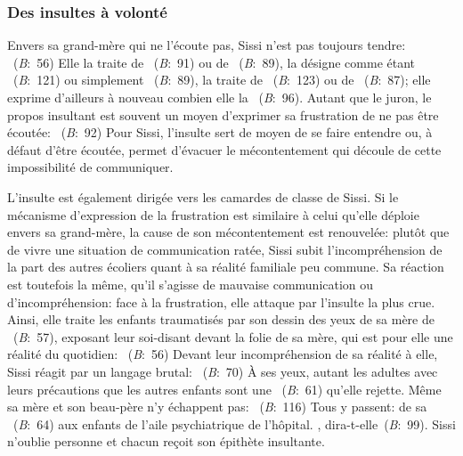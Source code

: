 \subsubsection{Des insultes à volonté}
Envers sa grand-mère qui ne l'écoute pas, Sissi n'est pas toujours tendre: ~(\textit{B}:~56)
Elle la traite de ~(\textit{B}:~91) ou de ~(\textit{B}:~89), la désigne comme étant ~(\textit{B}:~121) ou simplement ~(\textit{B}:~89), la traite de ~(\textit{B}:~123) ou de ~(\textit{B}:~87); elle exprime d'ailleurs à nouveau combien elle la ~(\textit{B}:~96).
Autant que le juron, le propos insultant est souvent un moyen d'exprimer sa frustration de ne pas être écoutée: ~(\textit{B}:~92)
Pour Sissi, l'insulte sert de moyen de se faire entendre ou, à défaut d'être écoutée, permet d'évacuer le mécontentement qui découle de cette impossibilité de communiquer.
\par
L'insulte est également dirigée vers les camardes de classe de Sissi.
Si le mécanisme d'expression de la frustration est similaire à celui qu'elle déploie envers sa grand-mère, la cause de son mécontentement est renouvelée: plutôt que de vivre une situation de communication ratée, Sissi subit l'incompréhension de la part des autres écoliers quant à sa réalité familiale peu commune.
Sa réaction est toutefois la même, qu'il s'agisse de mauvaise communication ou d'incompréhension: face à la frustration, elle attaque par l'insulte la plus crue.
Ainsi, elle traite les enfants traumatisés par son dessin des yeux de sa mère de ~(\textit{B}:~57), exposant leur soi-disant  devant la folie de sa mère, qui est pour elle une réalité du quotidien: ~(\textit{B}:~56)
Devant leur incompréhension de sa réalité à elle, Sissi réagit par un langage brutal: ~(\textit{B}:~70)
À ses yeux, autant les adultes avec leurs précautions que les autres enfants sont une ~(\textit{B}:~61) qu'elle rejette.
Même sa mère et son beau-père n'y échappent pas: ~(\textit{B}:~116)
Tous y passent: de sa ~(\textit{B}:~64) aux enfants de l'aile psychiatrique de l'hôpital.
, dira-t-elle~(\textit{B}:~99).
Sissi n'oublie personne et chacun reçoit son épithète insultante.

